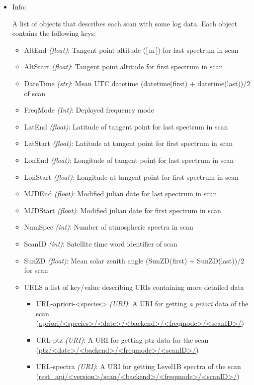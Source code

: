 \begin{itemize}
    \item Info:

        A list of objects that describes each scan
        with some log data.  
        Each object contains the following keys:

        \begin{itemize}
            \item AltEnd \emph{(float)}: Tangent point altitude ([\,m\,]) for last spectrum in scan
            \item AltStart \emph{(float)}: Tangent point altitude for first spectrum in scan
            \item DateTime \emph{(str)}: Mean UTC datetime (datetime(first) + datetime(last))/2 of scan
            \item FreqMode \emph{(Int)}: Deployed frequency mode
            \item LatEnd \emph{(float)}: Latitude of tangent point for last spectrum in scan
            \item LatStart \emph{(float)}: Latitude at tangent point for first spectrum in scan
            \item LonEnd \emph{(float)}: Longitude of tangent point for last spectrum in scan
            \item LonStart \emph{(float)}: Longitude at tangent point for first spectrum in scan
            \item MJDEnd \emph{(float)}: Modified julian date for last spectrum in scan
            \item MJDStart \emph{(float)}: Modified julian date for first spectrum in scan
            \item NumSpec \emph{(int)}: Number of atmospheric spectra in scan
            \item ScanID \emph{(int)}: Satellite time word identifier of scan
            \item SunZD \emph{(float)}: Mean solar zenith angle  (SunZD(first) + SunZD(last))/2 for scan
            \item URLS a list of key/value describing URIs containing
            more detailed data
            \begin{itemize} 
                \item URL-apriori-<species> \emph{(URI)}: 
                A URI for getting \textit{a priori} data of the scan\\
                (\url{apriori/<species>/<date>/<backend>/<freqmode>/<scanID>/})
                \item URL-ptz \emph{(URI)}: A URI for getting ptz data for the scan\\
                (\url{ptz/<date>/<backend>/<freqmode>/<scanID>/})
                \item URL-spectra \emph{(URI)}: A URI for getting Level1B spectra of the scan\\         
                (\url{rest_api/<version>/scan/<backend>/<freqmode>/<scanID>/})        
            \end{itemize}
       \end{itemize}   
\end{itemize}

